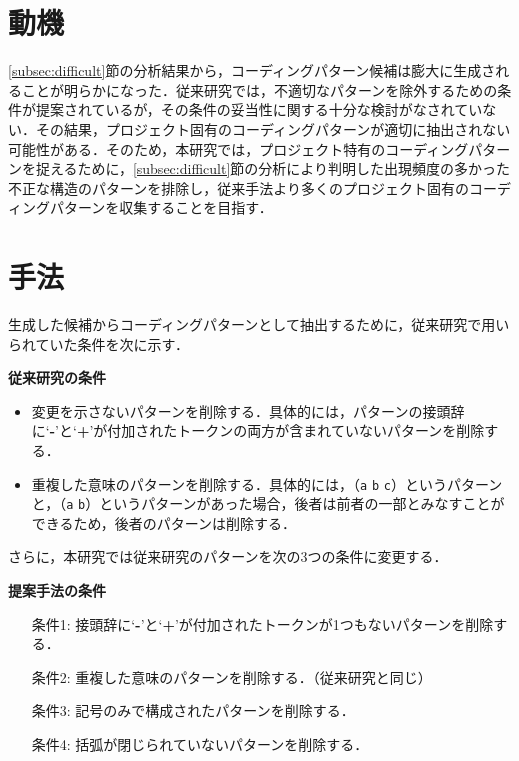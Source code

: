 \documentclass[11pt]{jreport}
\begin{document}
\section{動機}
\ref{subsec:difficult}節の分析結果から，コーディングパターン候補は膨大に生成されることが明らかになった．従来研究では，不適切なパターンを除外するための条件が提案されているが，その条件の妥当性に関する十分な検討がなされていない．その結果，プロジェクト固有のコーディングパターンが適切に抽出されない可能性がある．そのため，本研究では，プロジェクト特有のコーディングパターンを捉えるために，\ref{subsec:difficult}節の分析により判明した出現頻度の多かった不正な構造のパターンを排除し，従来手法より多くのプロジェクト固有のコーディングパターンを収集することを目指す．

\section{手法}
生成した候補からコーディングパターンとして抽出するために，従来研究で用いられていた条件を次に示す．

\textbf{従来研究の条件}
\begin{itemize}
    \item 変更を示さないパターンを削除する．具体的には，パターンの接頭辞に`\textbf{-}'と`\textbf{+}'が付加されたトークンの両方が含まれていないパターンを削除する．
    \item 重複した意味のパターンを削除する．具体的には，（\colorbox{lightgray!50}{\texttt{a}} \colorbox{lightgray!50}{\texttt{b}} \colorbox{lightgray!50}{\texttt{c}}）というパターンと，（\colorbox{lightgray!50}{\texttt{a}} \colorbox{lightgray!50}{\texttt{b}}）というパターンがあった場合，後者は前者の一部とみなすことができるため，後者のパターンは削除する．
\end{itemize}

さらに，本研究では従来研究のパターンを次の3つの条件に変更する．

\textbf{提案手法の条件}
\begin{itemize}
    \item[条件1: ] 接頭辞に`\textbf{-}'と`\textbf{+}'が付加されたトークンが1つもないパターンを削除する．
    \item[条件2: ] 重複した意味のパターンを削除する．（従来研究と同じ）
    \item[条件3: ] 記号のみで構成されたパターンを削除する．
    \item[条件4: ] 括弧が閉じられていないパターンを削除する．
\end{itemize}
\end{document}
